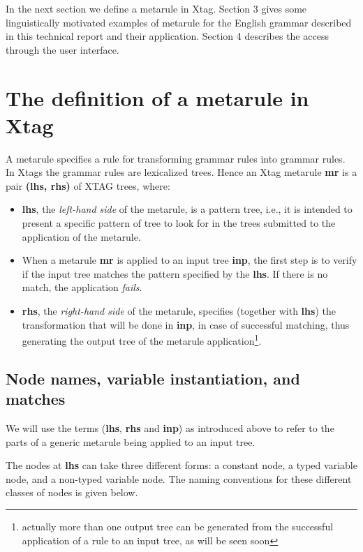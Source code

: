 In the next section we define a metarule in Xtag. 
Section 3 gives some
linguistically motivated examples
of metarule for the English grammar described in this
technical report and their application. Section 4 describes the access through 
the user interface.

\section{The definition of a metarule in Xtag}

A metarule specifies a rule for transforming grammar rules into grammar rules. 
In Xtags the grammar 
rules are lexicalized trees. Hence an Xtag metarule {\bf mr} 
is a pair {\bf (lhs, rhs)} of XTAG trees, where:

\begin{itemize}
\item {\bf lhs}, the {\it left-hand side} of the metarule, is a pattern tree,
	i.e., it is intended to present a specific pattern of tree to look for
	in the trees submitted to the application of the metarule.

\item When a metarule {\bf mr} is applied to an input tree {\bf inp}, the first
	step is to verify if the input tree matches the pattern specified by
	the {\bf lhs}. If there is no match, the application {\it fails}.

\item {\bf rhs}, the {\it right-hand side} of the metarule, specifies (together
	with {\bf lhs}) the transformation that will be done in {\bf inp},
	in case of successful matching, thus generating the output tree of
	the metarule application\footnote{actually more than one output tree 
	can be generated from the successful application of a rule to an 
	input tree, as will be seen soon}.
\end{itemize}
 
\subsection{Node names, variable instantiation, and matches}

We will use the terms ({\bf lhs}, {\bf rhs} and {\bf inp}) as introduced above
to refer to the parts of a generic metarule being applied to an input tree. 

The nodes at {\bf lhs} can take three 
different forms: a constant node, a typed variable node, and a non-typed 
variable node. The naming conventions for these different classes of nodes is 
given below.


